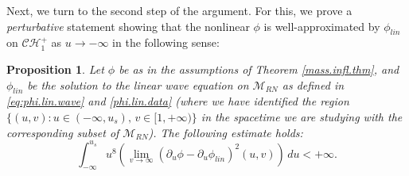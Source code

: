 \documentclass[10pt, reqno]{amsart}
\newtheorem{proposition}[theorem]{Proposition}
\theoremstyle{definition}
\theoremstyle{remark}
\numberwithin{equation}{section}
\newcommand{\rd}{\partial}
\newcommand{\0}{\emptyset}
\newcommand{\calC}{\mathcal C}
\newcommand{\calH}{\mathcal H}
\newcommand{\CH}{\calC \calH^{+}}		%
\begin{document}
Next, we turn to the second step of the argument. For this, we prove a \emph{perturbative} statement showing that the nonlinear $\phi$ is well-approximated by $\phi_{lin}$ on $\CH_1$ as $u\to-\infty$ in the following sense:
\begin{proposition}\label{linear.diff}
Let $\phi$ be as in the assumptions of Theorem \ref{mass.infl.thm}, and $\phi_{lin}$ be the solution to the linear wave equation on $\mathcal M_{RN}$ as defined in \eqref{eq:phi.lin.wave} and \eqref{phi.lin.data} (where we have identified the region $\{(u,v): u\in (-\infty, u_s),\, v\in [1,+\infty)\}$ in the spacetime we are studying with the corresponding subset of $\mathcal M_{RN}$). The following estimate holds: 
$$\int_{-\infty}^{u_s} u^{8}\left(\lim_{v\to\infty} (\rd_u\phi-\rd_u\phi_{lin})^2 (u,v)\right)\, du < +\infty.$$
\end{proposition}
\end{document}
